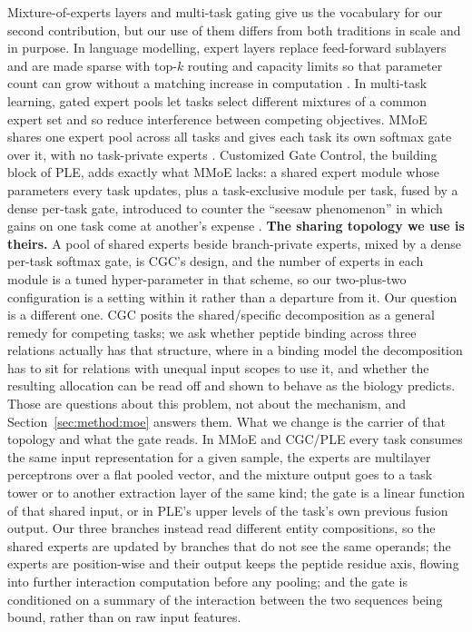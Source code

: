 \documentclass[webpdf,modern,large,namedate]{oup-authoring-template}
\theoremstyle{thmstyleone}
\theoremstyle{thmstyletwo}
\theoremstyle{thmstylethree}
\begin{document}
Mixture-of-experts layers and multi-task gating give us the vocabulary for our
second contribution, but our use of them differs from both traditions in scale
and in purpose. In language modelling, expert layers replace feed-forward
sublayers and are made sparse with top-$k$ routing and capacity limits so that
parameter count can grow without a matching increase in computation
\citep{shazeer2017outrageously, fedus2022switch}. In multi-task learning,
gated expert pools let tasks select different mixtures of a common expert set
and so reduce interference between competing objectives. MMoE shares one
expert pool across all tasks and gives each task its own softmax gate over it,
with no task-private experts \citep{ma2018mmoe}. Customized Gate Control, the
building block of PLE, adds exactly what MMoE lacks: a shared expert module
whose parameters every task updates, plus a task-exclusive module per task,
fused by a dense per-task gate, introduced to counter the ``seesaw
phenomenon'' in which gains on one task come at another's expense
\citep{tang2020ple}. \textbf{The sharing topology we use is theirs.} A pool of
shared experts beside branch-private experts, mixed by a dense per-task softmax
gate, is CGC's design, and the number of experts in each module is a tuned
hyper-parameter in that scheme, so our two-plus-two configuration is a setting
within it rather than a departure from it. Our question is a different one. CGC
posits the shared/specific decomposition as a general remedy for competing
tasks; we ask whether peptide binding across three relations actually has that
structure, where in a binding model the decomposition has to sit for relations
with unequal input scopes to use it, and whether the resulting allocation can
be read off and shown to behave as the biology predicts. Those are questions
about this problem, not about the mechanism, and
Section~\ref{sec:method:moe} answers them. What we change is the carrier of that
topology and what the gate reads. In MMoE and CGC/PLE every task consumes the
same input representation for a given sample, the experts are multilayer
perceptrons over a flat pooled vector, and the mixture output goes to a task
tower or to another extraction layer of the same kind; the gate is a linear
function of that shared input, or in PLE's upper levels of the task's own
previous fusion output. Our three branches instead read different entity
compositions, so the shared experts are updated by branches that do not see the
same operands; the experts are position-wise and their output keeps the peptide
residue axis, flowing into further interaction computation before any pooling;
and the gate is conditioned on a summary of the interaction between the two
sequences being bound, rather than on raw input features.
\end{document}
